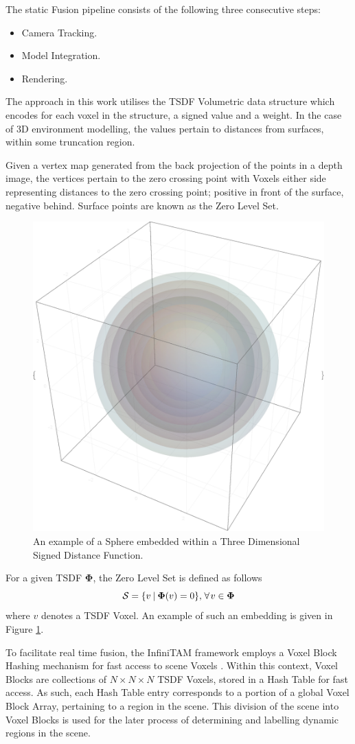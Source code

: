 The static Fusion pipeline consists of the following three consecutive steps:
\begin{itemize}
  \item Camera Tracking.
  \item Model Integration.
  \item Rendering.
\end{itemize}

The approach in this work utilises the TSDF Volumetric data structure which
encodes for each voxel in the structure, a signed value and a weight.
In the case of 3D environment modelling, the values pertain to distances from
surfaces, within some truncation region.

Given a vertex map generated from the back projection of the points in a depth
image, the vertices pertain to the zero crossing point with Voxels either side
representing distances to the zero crossing point; positive in front of the
surface, negative behind. Surface points are known as the Zero Level Set.
\begin{figure}[h]
  \label{fig:sdf_example}
  \centering
  \includegraphics[width=.5\linewidth]{figures/moseg/3d_sdf.eps}
  \caption{An example of a Sphere embedded within a Three Dimensional Signed
    Distance Function.}
\end{figure}

For a given TSDF $\mathbf{\Phi}$, the Zero Level Set is defined as follows
\begin{equation}
  \label{eqn:zero_level_definition}
  \mathcal{S} = \{v \:\vert\: \mathbf{\Phi}(v) = 0\}, 
  \mkern2mu \forall \mkern2mu v \in \mathbf{\Phi}
\end{equation}
where $v$ denotes a TSDF Voxel. An example of such an embedding is given in
Figure \ref{fig:sdf_example}.

To facilitate real time fusion, the InfiniTAM framework employs a Voxel Block
Hashing mechanism for fast access to scene Voxels \cite{NieBner2013}. Within
this context, Voxel Blocks are collections of $N \times N \times N$ TSDF Voxels,
stored in a Hash Table for fast access. As such, each Hash Table entry
corresponds to a portion of a global Voxel Block Array, pertaining to a region
in the scene. This division of the scene into Voxel Blocks is used for the later
process of determining and labelling dynamic regions in the scene.

